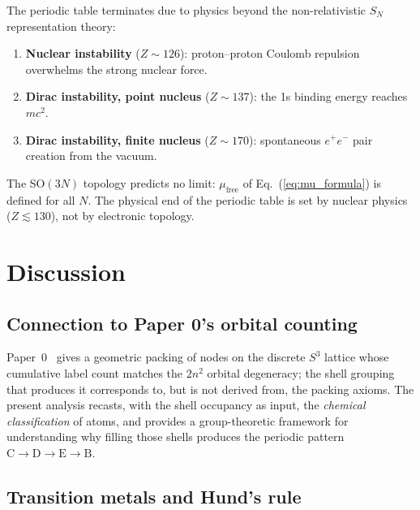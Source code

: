 \documentclass[aps,prl,twocolumn,superscriptaddress,longbibliography]{revtex4-2}
\newcommand{\mufree}{\mu_{\mathrm{free}}}
\begin{document}
The periodic table terminates due to physics beyond the
non-relativistic $S_N$ representation theory:
\begin{enumerate}
  \item \textbf{Nuclear instability} ($Z \sim 126$): proton--proton
    Coulomb repulsion overwhelms the strong nuclear force.
  \item \textbf{Dirac instability, point nucleus} ($Z \sim 137$): the
    1s binding energy reaches $mc^2$.
  \item \textbf{Dirac instability, finite nucleus} ($Z \sim 170$):
    spontaneous $e^+e^-$ pair creation from the vacuum.
\end{enumerate}
The SO$(3N)$ topology predicts no limit: $\mufree$ of
Eq.~(\ref{eq:mu_formula}) is defined for all $N$.  The physical end of the periodic table is set by
nuclear physics ($Z \lesssim 130$), not by electronic topology.


\section{Discussion}
\label{sec:discussion}

\subsection{Connection to Paper 0's orbital counting}

Paper~0~\cite{loutey_paper0} gives a geometric packing of nodes on the
discrete $S^3$ lattice whose cumulative label count matches the $2n^2$
orbital degeneracy; the shell grouping that produces it corresponds to,
but is not derived from, the packing axioms.  The present analysis
recasts, with the shell occupancy as input, the
\emph{chemical classification} of atoms, and provides a group-theoretic framework for
understanding why filling those shells produces the periodic pattern
$\mathrm{C} \to \mathrm{D} \to \mathrm{E} \to \mathrm{B}$.

\subsection{Transition metals and Hund's rule}
\end{document}

